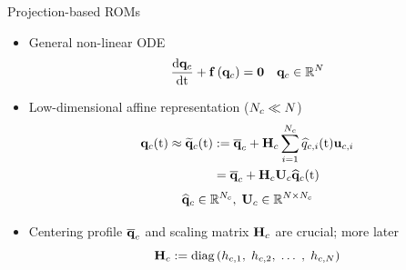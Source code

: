 \documentclass[]{beamer}
\begin{document}
\begin{frame}{Projection-based ROMs}
    \begin{itemize}
		\item General non-linear ODE
		\begin{equation*}
			\frac{\text{d} \mathbf{q}_{c}}{\text{d} \text{t}} + \mathbf{f} \left(\mathbf{q}_{c}\right) = \mathbf{0} \quad \mathbf{q}_{c} \in \mathbb{R}^{N}
		\end{equation*}
			\item Low-dimensional affine representation ($N_c \ll N$)
		\begin{align*}
			\consVec(\timeVar) \approx \consVecRom(\timeVar) &\defEq \consVecCent + \consScale \sum^{\numConsModes}_{i=1} \consVarCoef{i}(\timeVar) \consTrialVec{i} \\
			&= \consVecCent + \consScale \consTrial \consVecCoef(\timeVar)
		\end{align*}
		\begin{equation*}
			\consVecCoef \in \mathbb{R}^{\numConsModes}, \; \consTrial \in \mathbb{R}^{\numDOF \times \numConsModes}
		\end{equation*}
		\item Centering profile $\mathbf{\overline{q}}_{c}$ and scaling matrix $\consScale$ are crucial; more later
		\begin{equation*}
			\consScale \defEq \text{diag}\left( \consScaleVar{1}, \; \consScaleVar{2}, \; \hdots \;, \; \consScaleVar{\numDOF} \right)
		\end{equation*}
	\end{itemize}
\end{frame}
\end{document}
